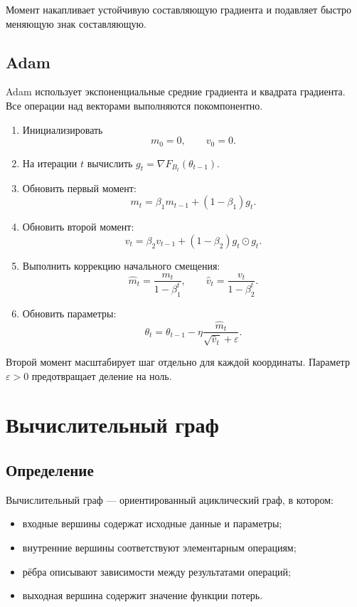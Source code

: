 \documentclass[12pt,a4paper]{article}
\theoremstyle{plain}
\theoremstyle{definition}
\theoremstyle{remark}
\begin{document}
Момент накапливает устойчивую составляющую градиента и подавляет
быстро меняющую знак составляющую.

\subsection{Adam}

Adam использует экспоненциальные средние градиента и квадрата
градиента. Все операции над векторами выполняются покомпонентно.

\begin{enumerate}
    \item Инициализировать
    \[
        m_0=0,
        \qquad
        v_0=0.
    \]
    \item На итерации $t$ вычислить $g_t=\nabla F_{B_t}(\theta_{t-1})$.
    \item Обновить первый момент:
    \[
        m_t
        =
        \beta_1m_{t-1}
        +
        (1-\beta_1)g_t.
    \]
    \item Обновить второй момент:
    \[
        v_t
        =
        \beta_2v_{t-1}
        +
        (1-\beta_2)g_t\odot g_t.
    \]
    \item Выполнить коррекцию начального смещения:
    \[
        \widehat{m}_t
        =
        \frac{m_t}{1-\beta_1^t},
        \qquad
        \widehat{v}_t
        =
        \frac{v_t}{1-\beta_2^t}.
    \]
    \item Обновить параметры:
    \[
        \theta_t
        =
        \theta_{t-1}
        -
        \eta
        \frac{\widehat{m}_t}
        {\sqrt{\widehat{v}_t}+\varepsilon}.
    \]
\end{enumerate}

Второй момент масштабирует шаг отдельно для каждой координаты.
Параметр $\varepsilon>0$ предотвращает деление на ноль.

\section{Вычислительный граф}

\subsection{Определение}

Вычислительный граф --- ориентированный ациклический граф, в котором:

\begin{itemize}
    \item входные вершины содержат исходные данные и параметры;
    \item внутренние вершины соответствуют элементарным операциям;
    \item рёбра описывают зависимости между результатами операций;
    \item выходная вершина содержит значение функции потерь.
\end{itemize}
\end{document}
